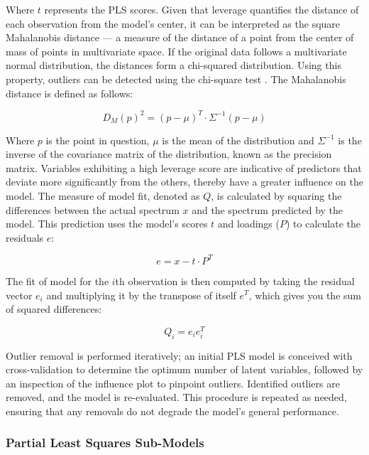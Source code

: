 Where $t$ represents the PLS scores.
Given that leverage quantifies the distance of each observation from the model's center, it can be interpreted as the square Mahalanobis distance — a measure of the distance of a point from the center of mass of points in multivariate space.
If the original data follows a multivariate normal distribution, the distances form a chi-squared distribution. Using this property, outliers can be detected using the chi-square test \cite{brereton_chi_2015}.
The Mahalanobis distance is defined as follows:

\begin{equation}
    D_M(p)^2 = (p - \mu)^T \cdot \Sigma^{-1} (p - \mu)
\end{equation}

Where $p$ is the point in question, $\mu$ is the mean of the distribution and $\Sigma^{-1}$ is the inverse of the covariance matrix of the distribution, known as the precision matrix.
Variables exhibiting a high leverage score are indicative of predictors that deviate more significantly from the others, thereby have a greater influence on the model.
The measure of model fit, denoted as $Q$, is calculated by squaring the differences between the actual spectrum $x$ and the spectrum predicted by the model. This prediction uses the model's scores $t$ and loadings ($P$) to calculate the residuals $e$:

\begin{equation}
    e = x - t \cdot P^T
\end{equation}

The fit of model for the $i$th observation is then computed by taking the residual vector $e_i$ and multiplying it by the transpose of itself $e^T$, which gives you the sum of squared differences:

\begin{equation}
    Q_i = e_{i}e_{i}^T
\end{equation} \cite{marini_chemometrics_2013} \citet{andersonImprovedAccuracyQuantitative2017}

Outlier removal is performed iteratively; an initial PLS model is conceived with cross-validation to determine the optimum number of latent variables, followed by an inspection of the influence plot to pinpoint outliers. Identified outliers are removed, and the model is re-evaluated. This procedure is repeated as needed, ensuring that any removals do not degrade the model's general performance.


\subsubsection{Partial Least Squares Sub-Models}\label{sec:pls_submodels}


